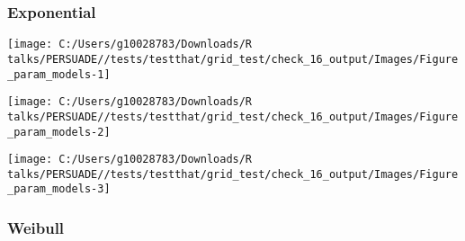 \documentclass[
]{article}
\begin{document}
\begin{table}[H]
\centering
\caption{\label{tab:Table_2}Goodness of fit statistics}
\centering
{}
\end{table}

\clearpage

\clearpage

\subsubsection{Exponential}\label{exponential}

\begin{flushleft}\texttt{[image: C:/Users/g10028783/Downloads/R talks/PERSUADE//tests/testthat/grid\_test/check\_16\_output/Images/Figure\_param\_models-1]} \end{flushleft}

\begin{flushleft}\texttt{[image: C:/Users/g10028783/Downloads/R talks/PERSUADE//tests/testthat/grid\_test/check\_16\_output/Images/Figure\_param\_models-2]} \end{flushleft}

\begin{flushleft}\texttt{[image: C:/Users/g10028783/Downloads/R talks/PERSUADE//tests/testthat/grid\_test/check\_16\_output/Images/Figure\_param\_models-3]} \end{flushleft}

\clearpage

\subsubsection{Weibull}\label{weibull}
\end{document}
